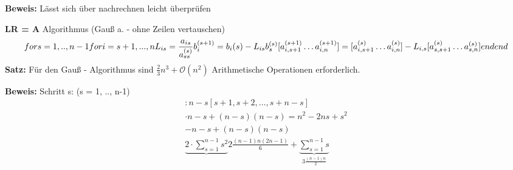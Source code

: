 \textbf{Beweis:}
Lässt sich über nachrechnen leicht überprüfen

\textbf{LR = A} %
Algorithmus (Gauß a. - ohne Zeilen vertauschen)
\begin{equation*}
  for s = 1, .., n-1  \\
	  for i = s+1, ..., n  \\
		  L_{is} = \frac{a_{is}}{a_{ss}^{\left(s\right)}}  \\
			b_i^{\left(s+1\right)} = b_i{\left(s\right)} - L_{is}b_s^{\left(s\right)}
			[a_{i, s+1}^{(s+1)} \ldots a_{i,n}^{(s+1)}] = [a_{i, s+1}^{(s)} \ldots a_{i,n}^{(s)}] - L_{i,s}[a_{s,s+1}^{(s)} \ldots a_{s,n}^{(s)}]
		end
	end
\end{equation*}
%
\textbf{Satz:}
Für den Gauß - Algorithmus sind $\frac{2}{3}n^3 + \mathcal O(n^2)$ Arithmetische Operationen erforderlich.

\textbf{Beweis:}
Schritt s: (s = 1, .., n-1)
\begin{equation*}
  \begin{aligned}
	  : n-s [s+1, s+2, \ldots, s+n - s] \\
		\cdot n-s + (n-s)(n-s) = n^2 - 2ns +s^2 \\
		- n-s + (n-s)(n-s) \\
		\hline
		\underbrace{2 \cdot \sum\limits_{s=1}^{n-1}{s^2}}{2 \frac{(n-1)n(2n-1)}{6}}+\underbrace{\sum\limits_{s=1}^{n-1}{s}}_{3\frac{(n-1)n}{2}}
	\end{aligned}
\end{equation*}

